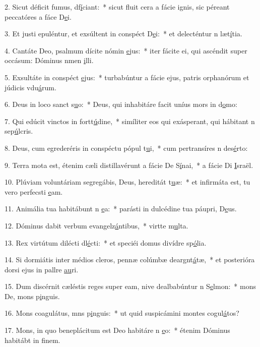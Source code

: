 2. Sicut déficit fumus, df\uline{í}ciant:~* sicut fluit cera a fácie ignis, sic péreant peccatóres a fáce D\uline{e}i.\par 
3. Et justi epuléntur, et exsúltent in conspéct D\uline{e}i:~* et delecténtur n læt\uline{í}tia.\par 
4. Cantáte Deo, psalmum dícite nómin \uline{e}jus:~* iter fácite ei, qui ascéndit super occásum: Dóminus nmen \uline{i}lli.\par 
5. Exsultáte in conspéct \uline{e}jus:~* turbabúntur a fácie ejus, patris orphanórum et júdicis vdu\uline{á}rum.\par 
6. Deus in loco sanct s\uline{u}o:~* Deus, qui inhabitáre facit uníus mors in d\uline{o}mo:\par 
7. Qui edúcit vinctos in fortt\uline{ú}dine,~* simíliter eos qui exásperant, qui hábitant n sep\uline{ú}lcris.\par 
8. Deus, cum egrederéris in conspéctu pópul t\uline{u}i,~* cum pertransíres n des\uline{é}rto:\par 
9. Terra mota est, étenim cæli distillavérunt a fácie De S\uline{í}nai,~* a fácie Di \uline{I}sraël.\par 
10. Plúviam voluntáriam segregábis, Deus, hereditát t\uline{u}æ:~* et infirmáta est, tu vero perfecsti \uline{e}am.\par 
11. Animália tua habitábunt n \uline{e}a:~* parásti in dulcédine tua páupri, D\uline{e}us.\par 
12. Dóminus dabit verbum evangelz\uline{á}ntibus,~* virtte m\uline{u}lta.\par 
13. Rex virtútum dilécti dl\uline{é}cti:~* et speciéi domus divídre sp\uline{ó}lia.\par 
14. Si dormiátis inter médios cleros, pennæ colúmbæ deargnt\uline{á}tæ,~* et posterióra dorsi ejus in pallre \uline{au}ri.\par 
15. Dum discérnit cæléstis reges super eam, nive dealbabúntur n S\uline{e}lmon:~* mons De, mons p\uline{i}nguis.\par 
16. Mons coagulátus, mns p\uline{i}nguis:~* ut quid suspicámini montes cogul\uline{á}tos?\par 
17. Mons, in quo beneplácitum est Deo habitáre n \uline{e}o:~* étenim Dóminus habitábt in f\uline{i}nem.\par 
